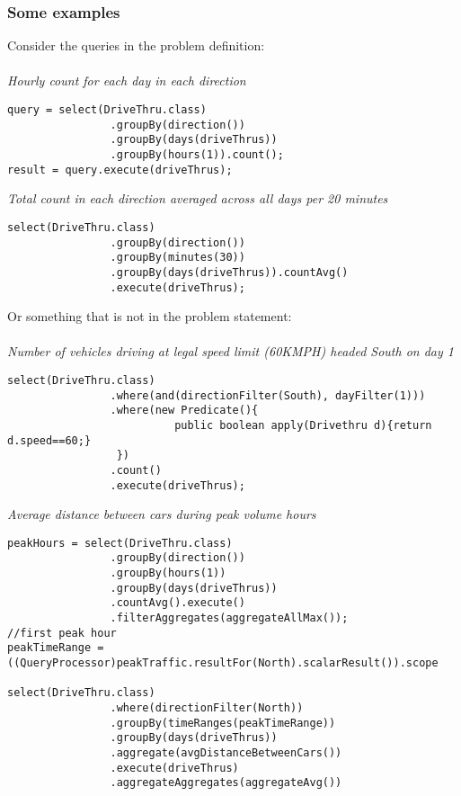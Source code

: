 \documentclass[a4paper]{article}
\begin{document}
\subsubsection{Some examples}
Consider the queries in the problem definition:\\\\
\emph{Hourly count for each day in each direction}
\begin{verbatim}
query = select(DriveThru.class)
                .groupBy(direction())
                .groupBy(days(driveThrus))
                .groupBy(hours(1)).count();
result = query.execute(driveThrus);
\end{verbatim}
\emph{Total count in each direction averaged across all days per 20 minutes}
\begin{verbatim}
select(DriveThru.class)
                .groupBy(direction())
                .groupBy(minutes(30))
                .groupBy(days(driveThrus)).countAvg()
                .execute(driveThrus);
\end{verbatim}
Or something that is not in the problem statement:\\\\
\emph{Number of vehicles driving at legal speed limit (60KMPH) headed South on day 1}
\begin{verbatim}
select(DriveThru.class)
                .where(and(directionFilter(South), dayFilter(1)))
                .where(new Predicate(){ 
                          public boolean apply(Drivethru d){return d.speed==60;}
                 })
                .count()
                .execute(driveThrus);
\end{verbatim}
\clearpage
\emph{Average distance between cars during peak volume hours}
\begin{verbatim}
peakHours = select(DriveThru.class)
                .groupBy(direction())
                .groupBy(hours(1))
                .groupBy(days(driveThrus))
                .countAvg().execute()
                .filterAggregates(aggregateAllMax());
//first peak hour
peakTimeRange = ((QueryProcessor)peakTraffic.resultFor(North).scalarResult()).scope

select(DriveThru.class)
                .where(directionFilter(North))
                .groupBy(timeRanges(peakTimeRange))
                .groupBy(days(driveThrus))
                .aggregate(avgDistanceBetweenCars())
                .execute(driveThrus)
                .aggregateAggregates(aggregateAvg())
\end{verbatim}
\end{document}
